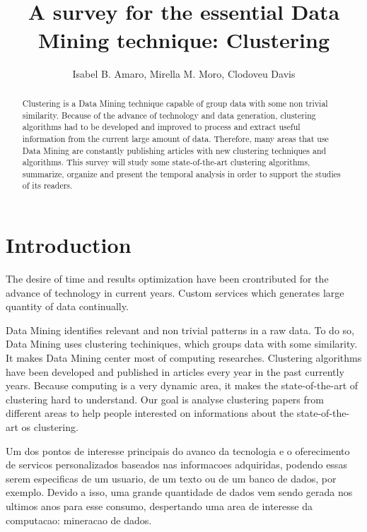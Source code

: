 \documentclass[12pt]{article}
\title{\\ A survey for the essential Data Mining technique: Clustering}
\author{Isabel B. Amaro\inst{1}, Mirella M. Moro\inst{2}, Clodoveu Davis\inst{3}}
\begin{document}
 

\maketitle

\begin{abstract}
Clustering is a Data Mining technique capable of group data with some non trivial similarity. Because of the advance of technology and data generation, clustering algorithms had to be developed and improved to process and extract useful information from the current large amount of data. Therefore, many areas that use Data Mining are constantly publishing articles with new clustering techniques and algorithms. This survey will study some state-of-the-art clustering algorithms, summarize, organize and present the temporal analysis in order to support the studies of its readers.
\end{abstract}

\section{Introduction}

\hspace{6ex} The desire of time and results optimization have been crontributed for the advance of technology in current years. Custom services which generates large quantity of data continually.

Data Mining identifies relevant and non trivial patterns in a raw data. To do so, Data Mining uses clustering techiniques, which groups data with some similarity. It makes Data Mining center most of computing researches. Clustering algorithms have been developed and published in articles every year in the past currently years. Because computing is a very dynamic area, it makes the state-of-the-art of clustering hard to understand. Our goal is analyse clustering papers from different areas to help people interested on informations about the state-of-the-art os clustering.

\hspace{6ex} Um dos pontos de interesse principais do avanco da tecnologia e o oferecimento de servicos personalizados baseados nas informacoes adquiridas, podendo essas serem especificas de um usuario, de um texto ou de um banco de dados, por exemplo. Devido a isso, uma grande quantidade de dados vem sendo gerada nos ultimos anos para esse consumo, despertando uma area de interesse da computacao: mineracao de dados.
\end{document}
